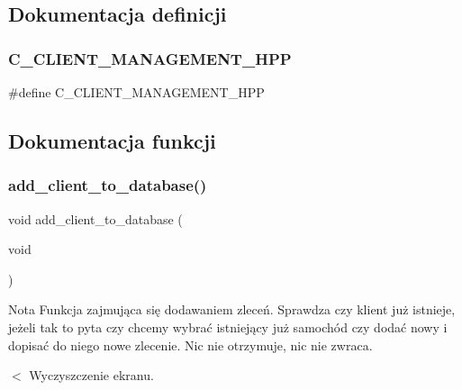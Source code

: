 \subsection{Dokumentacja definicji}
\mbox{\label{client__management_8cpp_a64134dede50723a77d5417ef0510b441}} 
\subsubsection{C\_CLIENT\_MANAGEMENT\_HPP}
{\footnotesize\ttfamily \#define C\+\_\+\+C\+L\+I\+E\+N\+T\+\_\+\+M\+A\+N\+A\+G\+E\+M\+E\+N\+T\+\_\+\+H\+PP}



\subsection{Dokumentacja funkcji}
\mbox{\label{client__management_8cpp_aa08591fea7169c59c6d5ae258f0b52d4}} 
\subsubsection{add\_client\_to\_database()}
{\footnotesize\ttfamily void add\+\_\+client\+\_\+to\+\_\+database (\begin{DoxyParamCaption}\item[{void}]{ }\end{DoxyParamCaption})}


\begin{DoxyCode}{0}
\end{DoxyCode}
 \begin{DoxyNote}{Nota}
Funkcja zajmująca się dodawaniem zleceń. Sprawdza czy klient już istnieje, jeżeli tak to pyta czy chcemy wybrać istniejący już samochód czy dodać nowy i dopisać do niego nowe zlecenie. Nic nie otrzymuje, nic nie zwraca. 
\end{DoxyNote}
$<$ Wyczyszczenie ekranu. \mbox{\label{client__management_8cpp_a5e13b21e6d0d5178dcf79fd167f8ef5b}} 
